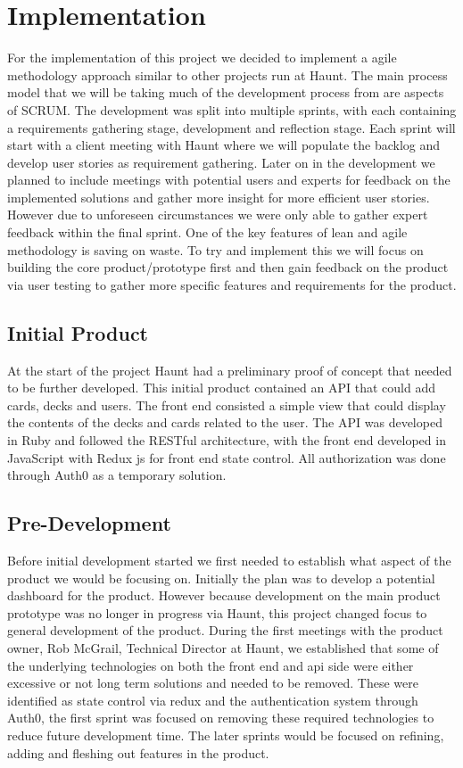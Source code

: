 
\chapter{Implementation}
For the implementation of this project we decided to implement a agile methodology approach similar to other projects run at  Haunt. The main process model that we will be taking much of the development process from are aspects of SCRUM. The development was split into multiple sprints, with each containing a requirements gathering stage, development and reflection stage. Each sprint will start with a client meeting with Haunt where we will populate the backlog and develop user stories as requirement gathering. Later on in the development we planned to include meetings with potential users and experts for feedback on the implemented solutions and gather more insight for more efficient user stories. However due to unforeseen circumstances we were only able to gather expert feedback within the final sprint. One of the key features of lean and agile methodology is saving on waste. To try and implement this we will focus on building the core product/prototype first and then gain feedback on the product via user testing to gather more specific features and requirements for the product.

\section{Initial Product}
At the start of the project Haunt had a preliminary proof of concept that needed to be further developed. This initial product contained an API that could add cards, decks and users. The front end consisted a simple view that could display the contents of the decks and cards related to the user. The API was developed in Ruby and followed the RESTful architecture, with the front end developed in JavaScript with Redux js for front end state control. All authorization was done through Auth0 as a temporary solution.

\section{Pre-Development}
Before initial development started we first needed to establish what aspect of the product we would be focusing on. Initially the plan was to develop a potential dashboard for the product. However because development on the main product prototype was no longer in progress via Haunt, this project changed focus to general development of the product.
During the first meetings with the product owner, Rob McGrail, Technical Director at Haunt, we established that some of the underlying technologies on both the front end and api side were either excessive or not long term solutions and needed to be removed. These were identified as state control via redux and the authentication system through Auth0, the first sprint was focused on removing these required technologies to reduce future development time. The later sprints would be focused on refining, adding and fleshing out features in the product.




